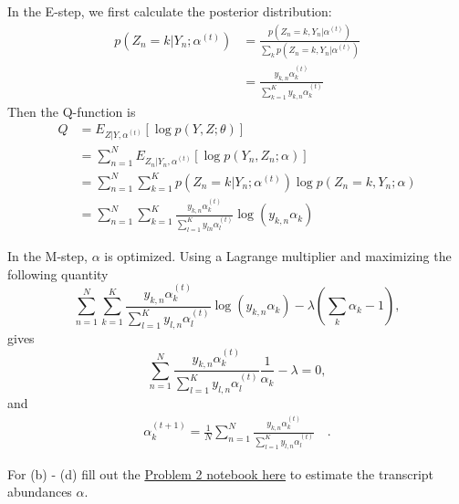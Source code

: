 \documentclass[11pt]{exam}
\begin{document}
\begin{questions}
In the E-step, we first calculate the posterior distribution:
\begin{align}
    p(Z_n=k|Y_n;\alpha^{(t)})&= \frac{p(Z_n=k,Y_n|\alpha^{(t)})}{\sum_k p(Z_n=k,Y_n|\alpha^{(t)}) } \nonumber\\
    &= \frac{  y_{k,n} \alpha^{(t)}_{k}}{ \sum_{k=1}^K y_{k,n} \alpha^{(t)}_{k}}
\end{align}
Then the Q-function is 
\begin{align*}
    Q &= E_{Z|Y,\alpha^{(t)}}[\log p(Y, Z;\theta)] \\
    &=\sum_{n=1}^N E_{Z_n|Y_n,\alpha^{(t)}}[\log p(Y_n, Z_n;\alpha)] \\
    &=\sum_{n=1}^N \sum_{k=1}^K p(Z_n=k|Y_n;\alpha^{(t)}) \log p(Z_n=k, Y_n;\alpha) \\
    &=\sum_{n=1}^N \sum_{k=1}^K \frac{ y_{k,n} \alpha^{(t)}_{k} }{ \sum_{l=1}^K  y_{ln} \alpha^{(t)}_{l}} \log ( y_{k,n} \alpha_{k})
\end{align*}

In the M-step, $\alpha$ is optimized. Using a Lagrange multiplier and maximizing the following quantity
$$
\sum_{n=1}^N \sum_{k=1}^K \frac{  y_{k,n} \alpha^{(t)}_{k} }{ \sum_{l=1}^K  y_{l,n} \alpha^{(t)}_{l}} \log (y_{k,n} \alpha_{k}) - \lambda (\sum_k \alpha_{k} -1),
$$
gives
$$
  \sum_{n=1}^N  \frac{ y_{k,n} \alpha^{(t)}_{k}}{\sum_{l=1}^K  y_{l,n} \alpha^{(t)}_{l}} \frac{1}{\alpha_k}-\lambda =0,
$$
and
\begin{align}
    \alpha_k^{(t+1)}= \frac{1}{N}\sum_{n=1}^N  \frac{ y_{k,n} \alpha^{(t)}_{k}}{\sum_{l=1}^K  y_{l,n} \alpha^{(t)}_{l}} \quad .
\end{align}



\hspace{1mm} For (b) - (d) fill out the \href{https://github.com/pachterlab/BI-BE-CS-183-2023/blob/main/HW4/Problem2.ipynb}{Problem 2 notebook here} to estimate the transcript abundances $\alpha$.


\end{questions}
\end{document}
